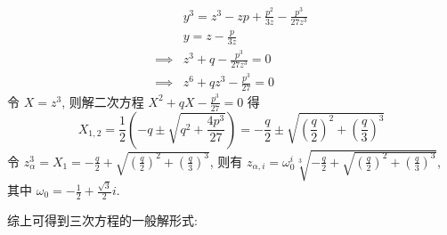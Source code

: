 \[ \begin{aligned}
    & y^3 = z^3 - zp + \frac{p^2}{3z} - \frac{p^3}{27z^3} \\
    & y = z - \frac{p}{3z} \\
    \implies & z^3 + q - \frac{p^3}{27z^3} = 0 \\
    \implies & z^6 + qz^3 - \frac{p^3}{27} = 0
\end{aligned} \]
令 $X = z^3$, 则解二次方程 $X^2 + qX - \frac{p^3}{27} = 0$ 得
\[
X_{1, 2} = \frac12 (-q \pm \sqrt{q^2 + \frac{4p^3}{27}}) = -\frac{q}{2} \pm \sqrt{(\frac{q}{2})^2 + (\frac{q}{3})^3}
\]
令 $z_\alpha^3 = X_1 = -\frac{q}{2} + \sqrt{(\frac{q}{2})^2 + (\frac{q}{3})^3}$, 则有 $z_{\alpha, i} = \omega^i_0 \sqrt[3]{-\frac{q}{2} + \sqrt{(\frac{q}{2})^2 + (\frac{q}{3})^3}}$, 其中 $\omega_0 = -\frac12 + \frac{\sqrt{3}}{2} i$.

综上可得到三次方程的一般解形式:


